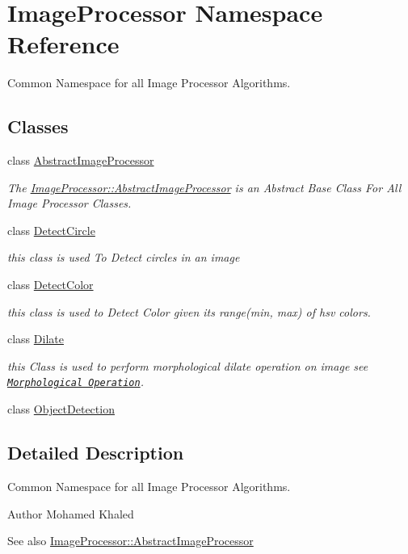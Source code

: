 \hypertarget{namespace_image_processor}{}\section{Image\+Processor Namespace Reference}
\label{namespace_image_processor}


Common Namespace for all Image Processor Algorithms.  


\subsection*{Classes}
\begin{DoxyCompactItemize}
\item 
class \hyperlink{class_image_processor_1_1_abstract_image_processor}{Abstract\+Image\+Processor}
\begin{DoxyCompactList}\small\item\em The \hyperlink{class_image_processor_1_1_abstract_image_processor}{Image\+Processor\+::\+Abstract\+Image\+Processor} is an Abstract Base Class For All Image Processor Classes. \end{DoxyCompactList}\item 
class \hyperlink{class_image_processor_1_1_detect_circle}{Detect\+Circle}
\begin{DoxyCompactList}\small\item\em this class is used To Detect circles in an image \end{DoxyCompactList}\item 
class \hyperlink{class_image_processor_1_1_detect_color}{Detect\+Color}
\begin{DoxyCompactList}\small\item\em this class is used to Detect Color given it\textquotesingle{}s range(min, max) of hsv colors. \end{DoxyCompactList}\item 
class \hyperlink{class_image_processor_1_1_dilate}{Dilate}
\begin{DoxyCompactList}\small\item\em this Class is used to perform morphological dilate operation on image see \href{https://docs.opencv.org/trunk/d9/d61/tutorial_py_morphological_ops.html}{\tt Morphological Operation}. \end{DoxyCompactList}\item 
class \hyperlink{class_image_processor_1_1_object_detection}{Object\+Detection}
\end{DoxyCompactItemize}


\subsection{Detailed Description}
Common Namespace for all Image Processor Algorithms. 

\begin{DoxyAuthor}{Author}
Mohamed Khaled 
\end{DoxyAuthor}
\begin{DoxySeeAlso}{See also}
\hyperlink{class_image_processor_1_1_abstract_image_processor}{Image\+Processor\+::\+Abstract\+Image\+Processor} 
\end{DoxySeeAlso}
